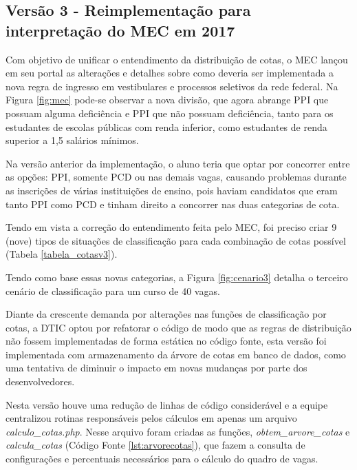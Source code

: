 \subsection{Versão 3 - Reimplementação para interpretação do MEC em 2017 }
\label{versao3}

Com objetivo de unificar o entendimento da distribuição de cotas, o \gls{MEC} lançou em seu portal as alterações e detalhes sobre como deveria ser implementada a nova regra de ingresso em vestibulares e processos seletivos da rede federal. Na Figura \ref{fig:mec} pode-se observar a nova divisão, que agora abrange \gls{PPI} que possuam alguma deficiência e \gls{PPI} que não possuam deficiência, tanto para os estudantes de escolas públicas com renda inferior, como estudantes de renda superior a 1,5 salários mínimos. 




Na versão anterior da implementação, o aluno teria que optar por concorrer entre as opções: \gls{PPI}, somente \gls{PCD} ou nas demais vagas, causando problemas durante as inscrições de várias instituições de ensino, pois haviam candidatos que eram tanto \gls{PPI} como \gls{PCD} e tinham direito a concorrer nas duas categorias de cota.

Tendo em vista a correção do entendimento feita pelo \gls{MEC}, foi preciso criar 9 (nove) tipos de situações de classificação para cada combinação de cotas possível (Tabela \ref{tabela_cotasv3}).



Tendo como base essas novas categorias, a Figura \ref{fig:cenario3} detalha o terceiro cenário de classificação para um curso de 40 vagas. 



\newpage
Diante da crescente demanda por alterações nas funções de classificação por cotas, a \gls{DTIC} optou por refatorar o código de modo que as regras de distribuição não fossem implementadas de forma estática no código fonte, esta versão foi implementada com armazenamento da árvore de cotas em banco de dados, como uma tentativa de diminuir o impacto em novas mudanças por parte dos desenvolvedores. 

Nesta versão houve uma redução de linhas de código considerável e a equipe centralizou rotinas responsáveis pelos cálculos em apenas um arquivo \textit{calculo\_cotas.php}. Nesse arquivo foram criadas as funções, \textit{obtem\_arvore\_cotas} e \textit{calcula\_cotas} (Código Fonte \ref{lst:arvorecotas}), que fazem a consulta de configurações e percentuais necessários para o cálculo do quadro de vagas. 

